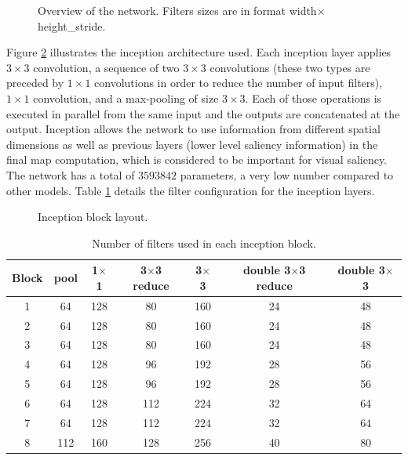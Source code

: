 \documentclass[10pt,twocolumn,letterpaper]{article}
\begin{document}
\begin{figure}
\begin{center}
\def\svgwidth{1.8\columnwidth}

\label{fig:model}
    \caption{Overview of the network.
        Filters sizes are in format width$\times$height\_stride.}
\end{center}
\end{figure}

Figure \ref{fig:newinception} illustrates the inception
architecture used.
Each inception layer applies
$3 \times 3$ convolution, a sequence of two $3 \times 3$ convolutions
(these two types are preceded by $1\times 1$ convolutions in order to
reduce the number of input filters), $1 \times 1$ convolution,
and a max-pooling of size $3 \times 3$.
Each of those operations is executed in parallel from the same input
and the outputs are concatenated at the output.
Inception allows the network to use
information from different spatial dimensions as well as previous
layers (lower level saliency information) in the final map
computation, which is considered to be important for visual saliency.
The network has a total of $3593842$ parameters, a very low number
compared to other models.
Table \ref{table:inception} details the filter configuration for the
inception layers.

\begin{figure}[!htb]
    \centering
    \def\svgwidth{\linewidth}
    
    \caption{Inception block layout.}
   \label{fig:newinception}
\end{figure}

\begin{table}
\begin{center}
\small
\label{table:inception}
\caption{Number of filters used in each inception block.}
\begin{tabular}{|c|c|c|c|c|c|c|}
	\hline
    Block & pool & 1$\times$1 & 3$\times$3 reduce &
    3$\times$3 & double 3$\times$3 reduce & double 3$\times$3\\
    \hline
    1 & 64 & 128 & 80 & 160 & 24 & 48\\
    \hline
    2 & 64 & 128 & 80 & 160 & 24 & 48\\
    \hline
    3 & 64 & 128 & 80 & 160 & 24 & 48\\
    \hline
    4 & 64 & 128 & 96 & 192 & 28 & 56\\
    \hline
    5 & 64 & 128 & 96 & 192 & 28 & 56\\
    \hline
    6 & 64 & 128 & 112 & 224 & 32 & 64\\
    \hline
    7 & 64 & 128 & 112 & 224 & 32 & 64\\
    \hline
    8 & 112 & 160 & 128 & 256 & 40 & 80\\
    \hline
\end{tabular}
\end{center}
\end{table}
\end{document}
